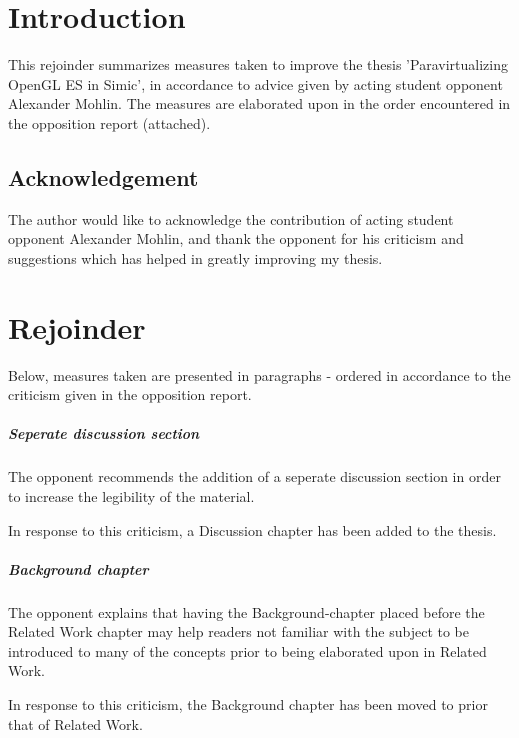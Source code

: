 \documentclass[a4paper,oneside]{bth}
\begin{document}
\pagestyle{plain}



\cleardoublepage
\pagestyle{headings}

\chapter*{Introduction}
This rejoinder summarizes measures taken to improve the thesis 'Paravirtualizing OpenGL ES in Simic', in accordance to advice given by acting student opponent Alexander Mohlin.
The measures are elaborated upon in the order encountered in the opposition report (attached).

\section*{Acknowledgement}
The author would like to acknowledge the contribution of acting student opponent Alexander Mohlin, and thank the opponent for his criticism and suggestions which has helped in greatly improving my thesis.

\chapter*{Rejoinder}
Below, measures taken are presented in paragraphs - ordered in accordance to the criticism given in the opposition report.

\paragraph{Seperate discussion section}
The opponent recommends the addition of a seperate discussion section in order to increase the legibility of the material.

In response to this criticism, a Discussion chapter has been added to the thesis.

\paragraph{Background chapter}
The opponent explains that having the Background-chapter placed before the Related Work chapter may help readers not familiar with the subject to be introduced to many of the concepts prior to being elaborated upon in Related Work.

In response to this criticism, the Background chapter has been moved to prior that of Related Work.
\end{document}
